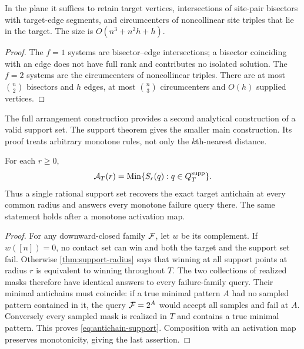 \begin{corollary}\label{cor:three-site}
In the plane it suffices to retain target vertices, intersections of site-pair bisectors with target-edge segments, and circumcenters of noncollinear site triples that lie in the target. The size is $O(n^3+n^2h+h)$.
\end{corollary}
\begin{proof}
The $f=1$ systems are bisector--edge intersections; a bisector coinciding with an edge does not have full rank and contributes no isolated solution. The $f=2$ systems are the circumcenters of noncollinear triples. There are at most $\binom n2$ bisectors and $h$ edges, at most $\binom n3$ circumcenters and $O(h)$ supplied vertices.
\end{proof}

The full arrangement construction provides a second analytical construction of a valid support set. The support theorem gives the smaller main construction. Its proof treats arbitrary monotone rules, not only the $k$th-nearest distance.

\begin{corollary}\label{cor:all-radii}
For each $r\ge0$,
\begin{equation}\label{eq:antichain-support}
\mathcal A_T(r)=\operatorname{Min}\{S_r(q):q\in Q_T^{\mathrm{supp}}\}.
\end{equation}
Thus a single rational support set recovers the exact target antichain at every common radius and answers every monotone failure query there. The same statement holds after a monotone activation map.
\end{corollary}
\begin{proof}
For any downward-closed family $\mathcal F$, let $w$ be its complement. If $w([n])=0$, no contact set can win and both the target and the support set fail. Otherwise \cref{thm:support-radius} says that winning at all support points at radius $r$ is equivalent to winning throughout $T$. The two collections of realized masks therefore have identical answers to every failure-family query. Their minimal antichains must coincide: if a true minimal pattern $A$ had no sampled pattern contained in it, the query $\mathcal F=2^A$ would accept all samples and fail at $A$. Conversely every sampled mask is realized in $T$ and contains a true minimal pattern. This proves \cref{eq:antichain-support}. Composition with an activation map preserves monotonicity, giving the last assertion.
\end{proof}

